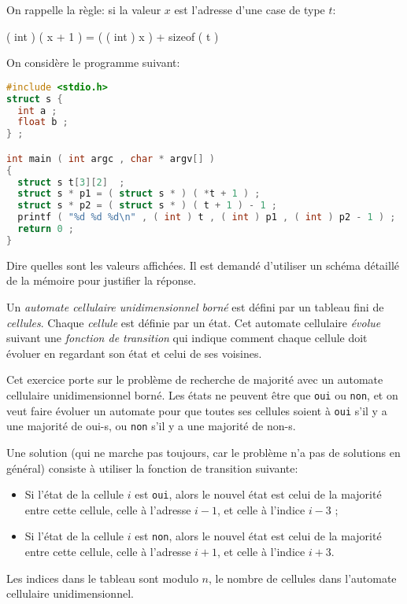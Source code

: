 On rappelle la règle: si la valeur \(x\) est l'adresse d'une case de type \(t\):
\begin{center}
  ( int ) ( x + 1 ) = ( ( int ) x ) + sizeof ( t ) 
\end{center}


On considère le programme suivant:
\begin{lstlisting}[language=C]
#include <stdio.h>
struct s {
  int a ;
  float b ;
} ;

int main ( int argc , char * argv[] )
{
  struct s t[3][2]  ;
  struct s * p1 = ( struct s * ) ( *t + 1 ) ;
  struct s * p2 = ( struct s * ) ( t + 1 ) - 1 ;
  printf ( "%d %d %d\n" , ( int ) t , ( int ) p1 , ( int ) p2 - 1 ) ;
  return 0 ;
}
\end{lstlisting}

Dire quelles sont les valeurs affichées. Il est demandé d'utiliser un
schéma détaillé de la mémoire pour justifier la réponse.



  Un \emph{automate cellulaire unidimensionnel born{\'e}} est
  d{\'e}fini par un tableau fini de \emph{cellules}. Chaque \emph{cellule}
  est d{\'e}finie par un {\'e}tat. Cet automate cellulaire \emph{{\'e}volue} suivant une
  \emph{fonction de transition} qui indique comment chaque cellule doit 
  {\'e}voluer en regardant son {\'e}tat et celui de ses voisines.

  Cet exercice porte sur le probl{\`e}me de recherche de majorit{\'e} avec un
  automate cellulaire unidimensionnel born{\'e}. Les {\'e}tats ne peuvent
  {\^e}tre que \texttt{oui} ou \texttt{non}, et on veut faire {\'e}voluer un
  automate pour que toutes ses cellules soient {\`a} \texttt{oui} s'il y a
  une majorit{\'e} de oui-s, ou \texttt{non} s'il y a une majorit{\'e} de non-s.

  Une solution (qui ne marche pas toujours, car le probl{\`e}me n'a pas de
  solutions en g{\'e}n{\'e}ral) consiste {\`a} utiliser la fonction de transition
  suivante:
  \begin{itemize}
  \item Si l'{\'e}tat de la cellule $i$ est \texttt{oui}, alors le nouvel 
  {\'e}tat est celui de la majorit{\'e} entre cette cellule, celle {\`a} 
  l'adresse $i-1$, et celle {\`a} l'indice $i-3$ ;
  \item Si l'{\'e}tat de la cellule $i$ est \texttt{non}, alors le nouvel 
  {\'e}tat est celui de la majorit{\'e} entre cette cellule, celle {\`a} 
  l'adresse $i+1$, et celle {\`a} l'indice $i+3$.
  \end{itemize}
  Les indices dans le tableau sont modulo $n$, le nombre de cellules 
  dans l'automate cellulaire unidimensionnel.

